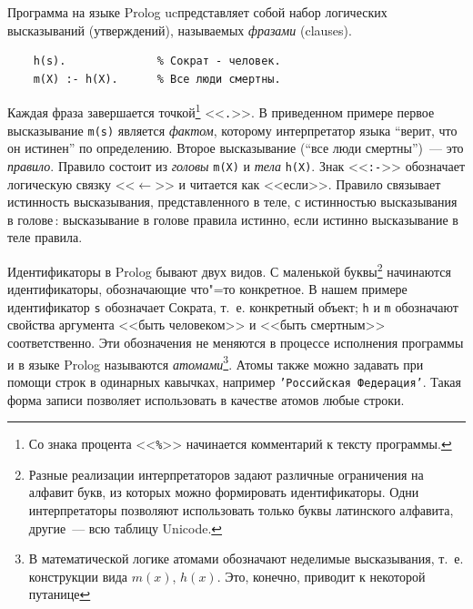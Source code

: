 \documentclass[a4paper,14pt, openany, twoside, draft]{extbook} %
\begin{document}
Программа на языке Prolog ucпредставляет собой набор логических высказываний (утверждений), называемых \emph{фразами} (\foreignlanguage{english}{clauses}).

\begin{verbatim}
    h(s).              % Сократ - человек.
    m(X) :- h(X).      % Все люди смертны.
\end{verbatim}

  Каждая фраза завершается точкой\footnote{Со знака процента <<\texttt{\%}>> начинается комментарий к тексту программы.}  <<\texttt{.}>>.  В приведенном примере первое высказывание \texttt{m(s)} является \emph{фактом}, которому интерпретатор языка ``верит, что он истинен'' по определению.  Второе высказывание (``все люди смертны'')~--- это \emph{правило}.  Правило состоит из \emph{головы} \texttt{m(X)} и \emph{тела} \texttt{h(X)}.  Знак <<\texttt{:-}>> обозначает логическую связку <<$\leftarrow$>> и читается как <<если>>.  Правило связывает истинность высказывания, представленного в теле, с истинностью высказывания в голове\,: высказывание в голове правила истинно, если истинно высказывание в теле правила.


Идентификаторы в Prolog бывают двух видов.  С маленькой буквы\footnote{Разные реализации интерпретаторов задают различные ограничения на алфавит букв, из которых можно формировать идентификаторы.  Одни интерпретаторы позволяют использовать только буквы латинского алфавита, другие~--- всю таблицу Unicode.} начинаются идентификаторы, обозначающие что"=то конкретное.  В нашем примере идентификатор \texttt{s} обозначает Сократа, т.~е. конкретный объект; \texttt{h} и \texttt{m} обозначают свойства аргумента <<быть человеком>> и <<быть смертным>> соответственно.  Эти обозначения не меняются в процессе исполнения программы и в языке Prolog называются \emph{атомами}\footnote{В математической логике атомами обозначают неделимые высказывания, т.~е. конструкции вида $m(x)$, $h(x)$.  Это, конечно, приводит к некоторой путанице}.  Атомы также можно задавать при помощи строк в одинарных кавычках, например \texttt{'Российская Федерация'}.  Такая форма записи позволяет использовать в качестве атомов любые строки.
\end{document}
